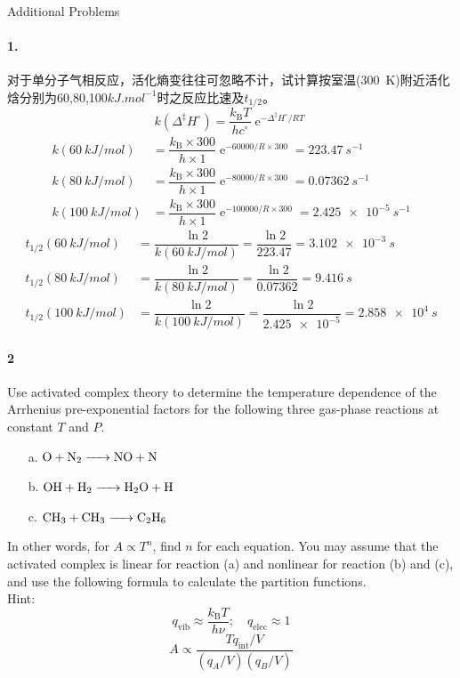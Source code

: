 \documentclass[a4paper]{article}
\DeclareMathOperator{\e}{\mathrm{e}}
\newcommand{\kB}{k_\mathrm{B}}
\newcommand{\ex}[1]{\paragraph{#1}}
\numberwithin{equation}{section}
\begin{document}
Additional Problems\\
\ex{1.} 对于单分子气相反应，活化熵变往往可忽略不计，试计算按室温(\SI{300}{K})附近活化焓分别为60,80,100$ \si{kJ.mol^{-1}} $时之反应比速及$ t_{1/2} $。\\
\begin{equation}\label{key}
k(\Delta^\ddagger H^\circ) = \dfrac{\kB T}{hc^\circ}\e^{-\Delta^\ddagger H^\circ / RT}
\end{equation}
\begin{align}
k(\SI{60}{kJ/mol}) &= \dfrac{\kB \times 300}{h \times 1}\e^{-60000 / R\times 300} = \SI{223.47}{s^{-1}} \\
k(\SI{80}{kJ/mol}) &= \dfrac{\kB \times 300}{h \times 1}\e^{-80000 / R\times 300} = \SI{0.07362}{s^{-1}} \\
k(\SI{100}{kJ/mol}) &= \dfrac{\kB \times 300}{h \times 1}\e^{-100000 / R\times 300} = \SI{2.425e-5}{s^{-1}} 
\end{align}
\begin{align}
t_{1/2}(\SI{60}{kJ/mol}) &= \dfrac{\ln 2}{k(\SI{60}{kJ/mol})} = \dfrac{\ln 2}{223.47} = \SI{3.102e-3}{s}\\
t_{1/2}(\SI{80}{kJ/mol}) &= \dfrac{\ln 2}{k(\SI{80}{kJ/mol})} = \dfrac{\ln 2}{0.07362} = \SI{9.416}{s}\\
t_{1/2}(\SI{100}{kJ/mol}) &= \dfrac{\ln 2}{k(\SI{100}{kJ/mol})} = \dfrac{\ln 2}{\num{2.425e-5}} = \SI{2.858e4}{s}
\end{align}

\newpage
\ex{2}
Use activated complex theory to determine the temperature dependence of the Arrhenius pre-exponential factors for the following three gas-phase reactions at constant $ T $ and $ P $.
\begin{enumerate}
	\item [a.] $ \ce{O + N_2 -> NO + N }$
	\item [b.] $ \ce{OH + H_2 -> H_2O + H} $
	\item [c.] $ \ce{CH_3 + CH_3 -> C_2H_6} $
\end{enumerate}
In other words, for $ A\propto T^n $, find $ n $ for each equation. You may assume that the activated complex is linear for reaction (a) and nonlinear for reaction (b) and (c), and use the following formula to calculate the partition functions.\\
Hint:
\begin{equation}\label{key}
q_{\text{vib}} \approx \dfrac{\kB T}{h\nu}; \quad q_{\text{elec}} \approx 1
\end{equation}
\begin{equation}\label{key}
A\propto \dfrac{T q_{\text{int}}/V}{(q_A/V)(q_B/V)}
\end{equation}
\end{document}
